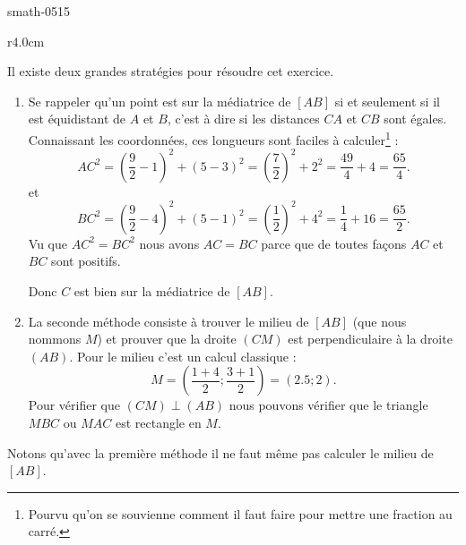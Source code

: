 
\begin{corrige}{smath-0515}

\begin{wrapfigure}[10]{r}{4.0cm}
   \vspace{-0.5cm}        %
   \centering
   
\end{wrapfigure}

    Il existe deux grandes stratégies pour résoudre cet exercice.
    \begin{enumerate}
        \item
            Se rappeler qu'un point est sur la médiatrice de \( [AB]\) si et seulement si il est équidistant de \( A\) et \( B\), c'est à dire si les distances \( CA\) et \( CB\) sont égales. Connaissant les coordonnées, ces longueurs sont faciles à calculer\footnote{Pourvu qu'on se souvienne comment il faut faire pour mettre une fraction au carré.} :
            \begin{equation*}
                AC^2=\left( \frac{ 9 }{2}-1 \right)^2+(5-3)^2=\left( \frac{ 7 }{2} \right)^2+2^2=\frac{ 49 }{ 4 }+4=\frac{ 65 }{ 4 }.
            \end{equation*}
            et
            \begin{equation*}
                BC^2=\left( \frac{ 9 }{2}-4 \right)^2+(5-1)^2=\left( \frac{ 1 }{2} \right)^2+4^2=\frac{1}{ 4 }+16=\frac{ 65 }{ 2 }.
            \end{equation*}
            Vu que \( AC^2=BC^2\) nous avons \( AC=BC\) parce que de toutes façons \( AC\) et \( BC\) sont positifs.

            Donc \( C\) est bien sur la médiatrice de \( [AB]\).

        \item
            La seconde méthode consiste à trouver le milieu de \( [AB]\) (que nous nommons \( M\)) et prouver que la droite \( (CM)\) est perpendiculaire à la droite \( (AB)\). Pour le milieu c'est un calcul classique :
            \begin{equation*}
                M=\left( \frac{ 1+4 }{2};\frac{ 3+1 }{2} \right)=(2.5;2).
            \end{equation*}
            Pour vérifier que \( (CM)\perp(AB)\) nous pouvons vérifier que le triangle \( MBC\) ou \( MAC\) est rectangle en \( M\).


    \end{enumerate}
    Notons qu'avec la première méthode il ne faut même pas calculer le milieu de \( [AB]\).

\end{corrige}
